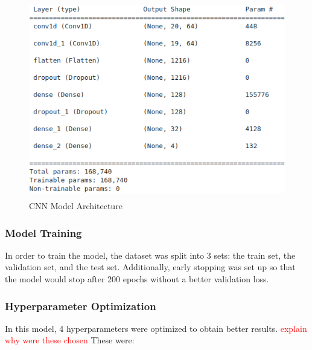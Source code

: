 \begin{figure}[h]
\centerline{\includegraphics[height=3.4in]{figs/cnn_architecture.png}}
\caption[CNN Architecture]{CNN Model Architecture}
\label{fig:cnn_architecture}
\end{figure}

\subsubsection{Model Training}

In order to train the model, the dataset was split into 3 sets: the train set, the validation set, and the test set. Additionally, early stopping was set up so that the model would stop after 200 epochs without a better validation loss.

\subsubsection{Hyperparameter Optimization}

In this model, 4 hyperparameters were optimized to obtain better results. \textcolor{red}{explain why were these chosen}
These were:

\newcommand\myc{3cm}
\newcommand\mycc{7cm}
\newcommand\myccc{2.3cm}

